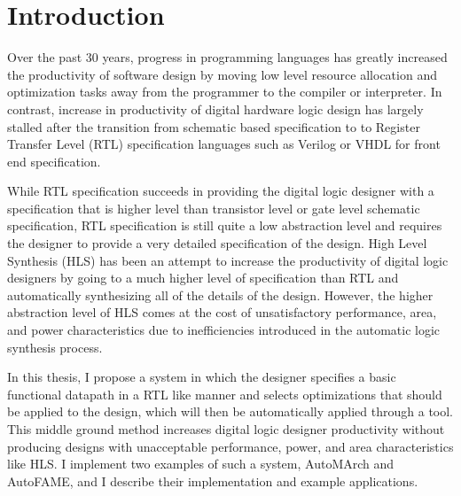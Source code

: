 \section{Introduction}
Over the past 30 years, progress in programming languages has greatly increased the productivity of software design by moving low level resource allocation and optimization tasks away from the programmer to the compiler or interpreter.  In contrast, increase in productivity of digital hardware logic design has largely stalled after the transition from schematic based specification to to Register Transfer Level (RTL) specification languages such as Verilog or VHDL for front end specification.

While RTL specification succeeds in providing the digital logic designer with a specification that is higher level than transistor level or gate level schematic specification, RTL specification is still quite a low abstraction level and requires the designer to provide a very detailed specification of the design. High Level Synthesis (HLS) has been an attempt to increase the productivity of digital logic designers by going to a much higher level of specification than RTL and automatically synthesizing all of the details of the design. However, the higher abstraction level of HLS comes at the cost of unsatisfactory performance, area, and power characteristics due to inefficiencies introduced in the automatic logic synthesis process.

In this thesis, I propose a system in which the designer specifies a basic functional datapath in a RTL like manner and selects optimizations that should be applied to the design, which will then be automatically applied through a tool. This middle ground method increases digital logic designer productivity without producing designs with unacceptable performance, power, and area characteristics like HLS. I implement two examples of such a system, AutoMArch and AutoFAME, and I describe their implementation and example applications.

